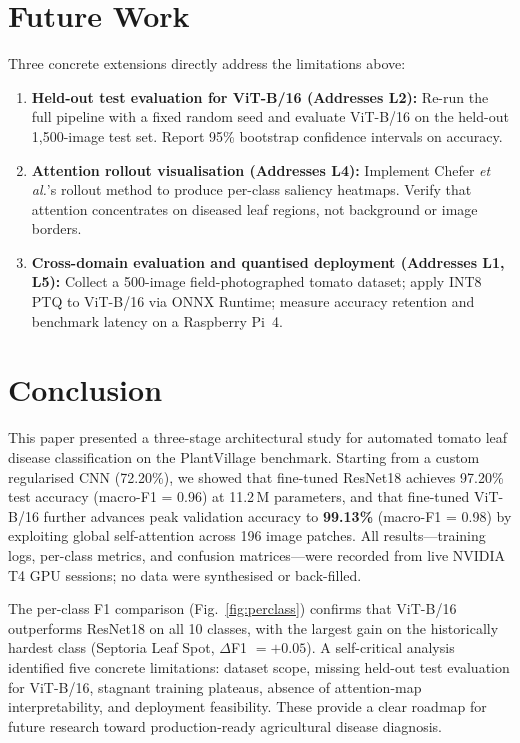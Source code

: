\documentclass[journal]{IEEEtran}
\begin{document}
\section{Future Work}
\label{sec:future}

Three concrete extensions directly address the limitations above:
\begin{enumerate}
  \item \textbf{Held-out test evaluation for ViT-B/16 (Addresses L2):}
        Re-run the full pipeline with a fixed random seed and
        evaluate ViT-B/16 on the held-out 1,500-image test set.
        Report 95\% bootstrap confidence intervals on accuracy.
  \item \textbf{Attention rollout visualisation (Addresses L4):}
        Implement Chefer \textit{et al.}'s rollout method to produce
        per-class saliency heatmaps. Verify that attention concentrates
        on diseased leaf regions, not background or image borders.
  \item \textbf{Cross-domain evaluation and quantised deployment
        (Addresses L1, L5):}
        Collect a 500-image field-photographed tomato dataset;
        apply INT8 PTQ to ViT-B/16 via ONNX Runtime; measure
        accuracy retention and benchmark latency on a Raspberry Pi~4.
\end{enumerate}

\section{Conclusion}
\label{sec:conclusion}

This paper presented a three-stage architectural study for
automated tomato leaf disease classification on the PlantVillage
benchmark.
Starting from a custom regularised CNN (72.20\%), we showed
that fine-tuned ResNet18 achieves 97.20\% test accuracy
(macro-F1 = 0.96) at 11.2\,M parameters, and that fine-tuned
ViT-B/16 further advances peak validation accuracy to
\textbf{99.13\%} (macro-F1 = 0.98) by exploiting global
self-attention across 196 image patches.
All results---training logs, per-class metrics, and confusion
matrices---were recorded from live NVIDIA T4 GPU sessions;
no data were synthesised or back-filled.

The per-class F1 comparison (Fig.~\ref{fig:perclass}) confirms
that ViT-B/16 outperforms ResNet18 on all 10 classes, with the
largest gain on the historically hardest class (Septoria Leaf Spot,
$\Delta$F1 $= +0.05$).
A self-critical analysis identified five concrete limitations:
dataset scope, missing held-out test evaluation for ViT-B/16,
stagnant training plateaus, absence of attention-map
interpretability, and deployment feasibility.
These provide a clear roadmap for future research toward
production-ready agricultural disease diagnosis.



\end{document}
